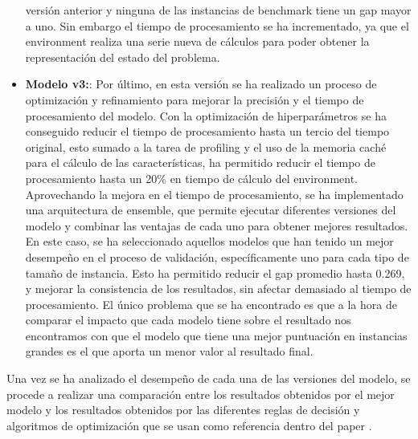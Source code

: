 \begin{itemize}
        versión anterior y ninguna de las instancias de benchmark tiene un gap mayor
        a uno. Sin embargo el tiempo de procesamiento se ha incrementado, ya que el
        environment realiza una serie nueva de cálculos para poder obtener la
        representación del estado del problema.
    \item \textbf{Modelo v3:}: Por último, en esta versión se ha
        realizado un proceso de optimización y refinamiento para
        mejorar la precisión y el tiempo de procesamiento del modelo. 
        Con la optimización de hiperparámetros se ha conseguido reducir
        el tiempo de procesamiento hasta un tercio del tiempo original, esto
        sumado a la tarea de profiling y el uso de la memoria caché para el
        cálculo de las características, ha permitido reducir el tiempo de procesamiento
        hasta un 20\% en tiempo de cálculo del environment. Aprovechando la mejora
        en el tiempo de procesamiento, se ha implementado una arquitectura de
        ensemble, que permite ejecutar diferentes versiones del modelo y combinar
        las ventajas de cada uno para obtener mejores resultados. En este caso, se
        ha seleccionado aquellos modelos que han tenido un mejor desempeño en el
        proceso de validación, específicamente uno para cada tipo de tamaño de
        instancia. Esto ha permitido reducir el gap promedio hasta 0.269, y
        mejorar la consistencia de los resultados, sin afectar demasiado al
        tiempo de procesamiento. El único problema que se ha encontrado es que
        a la hora de comparar el impacto que cada modelo tiene sobre el resultado
        nos encontramos con que el modelo que tiene una mejor puntuación en 
        instancias grandes es el que aporta un menor valor al resultado final.
\end{itemize}

Una vez se ha analizado el desempeño de cada una de las versiones del modelo,
se procede a realizar una comparación entre los resultados obtenidos por el
mejor modelo y los resultados obtenidos por las diferentes reglas de decisión
y algoritmos de optimización que se usan como referencia dentro del 
paper \cite{pbrandimarte}.

